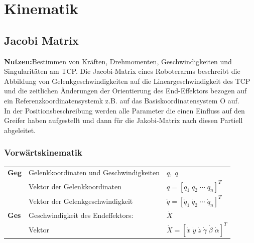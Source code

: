 
\section{Kinematik}
\subsection{Jacobi Matrix}
\textbf{Nutzen:}Bestimmen von Kräften, Drehmomenten, Geschwindigkeiten und Singularitäten am TCP.\newline
Die Jacobi-Matrix eines Roboterarms beschreibt die Abbildung von
Gelenkgeschwindigkeiten auf die Lineargeschwindigkeit des TCP
und die zeitlichen Änderungen der Orientierung des End-Effektors
bezogen auf ein Referenzkoordinatensystemk z.B. auf das
Basiskoordinatensystem O auf. \\
In der Positionsbeschreibung werden alle Parameter die einen Einfluss 
auf den Greifer haben aufgestellt und dann für die Jakobi-Matrix nach diesen Partiell abgeleitet.

\subsubsection{Vorwärtskinematik}
\vspace{-0.5cm}	
\begin{tabular}{lll}
    \textbf{Geg}&Gelenkkoordinaten und Geschwindigkeiten&$q,\; \dot{q}$\\
    &Vektor der Gelenkkoordinaten&$ q = \left[ q_1\; q_2 \;  \cdots \;  q_n\right]^T$\\
    &Vektor der Gelenkgeschwindigkeit&$ \dot{q} = \left[\dot{q}_1\; \dot{q}_2\; \cdots\;  \dot{q}_n \right]^T$\\
    \textbf{Ges}&Geschwindigkeit des Endeffektors:&$\dot{X}$\\
    &Vektor&$\dot{X} = [\dot{x}\; \dot{y}\; \dot{z}\;
    \dot{\gamma}\; \dot{\beta}\; \dot{\alpha}]^{T}$\\
\end{tabular}

